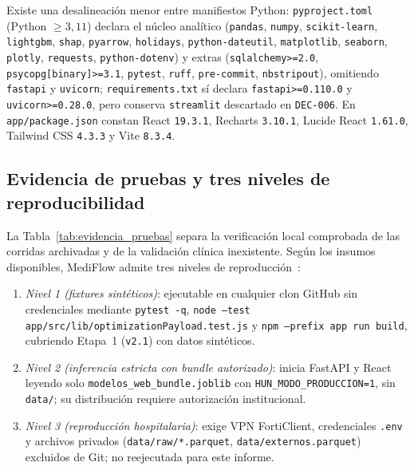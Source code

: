 Existe una desalineación menor entre manifiestos Python: \texttt{pyproject.toml} (Python $\ge 3{,}11$) declara el núcleo analítico (\texttt{pandas}, \texttt{numpy}, \texttt{scikit-learn}, \texttt{lightgbm}, \texttt{shap}, \texttt{pyarrow}, \texttt{holidays}, \texttt{python-dateutil}, \texttt{matplotlib}, \texttt{seaborn}, \texttt{plotly}, \texttt{requests}, \texttt{python-dotenv}) y extras (\texttt{sqlalchemy>=2.0}, \texttt{psycopg[binary]>=3.1}, \texttt{pytest}, \texttt{ruff}, \texttt{pre-commit}, \texttt{nbstripout}), omitiendo \texttt{fastapi} y \texttt{uvicorn}; \texttt{requirements.txt} sí declara \texttt{fastapi>=0.110.0} y \texttt{uvicorn>=0.28.0}, pero conserva \texttt{streamlit} descartado en \texttt{DEC-006}. En \texttt{app/package.json} constan React \texttt{19.3.1}, Recharts \texttt{3.10.1}, Lucide React \texttt{1.61.0}, Tailwind CSS \texttt{4.3.3} y Vite \texttt{8.3.4}.

\subsection{Evidencia de pruebas y tres niveles de reproducibilidad}

La Tabla~\ref{tab:evidencia_pruebas} separa la verificación local comprobada de las corridas archivadas y de la validación clínica inexistente. Según los insumos disponibles, MediFlow admite tres niveles de reproducción~\cite{mediflow2026informe,mediflow2026auditoria}:
\begin{enumerate}[leftmargin=*,nosep]
\item \textit{Nivel 1 (fixtures sintéticos)}: ejecutable en cualquier clon GitHub sin credenciales mediante \texttt{pytest -q}, \texttt{node --test app/src/lib/optimizationPayload.test.js} y \texttt{npm --prefix app run build}, cubriendo Etapa~1 (\texttt{v2.1}) con datos sintéticos.
\item \textit{Nivel 2 (inferencia estricta con bundle autorizado)}: inicia FastAPI y React leyendo solo \texttt{modelos\_web\_bundle.joblib} con \texttt{HUN\_MODO\_PRODUCCION=1}, sin \texttt{data/}; su distribución requiere autorización institucional.
\item \textit{Nivel 3 (reproducción hospitalaria)}: exige VPN FortiClient, credenciales \texttt{.env} y archivos privados (\texttt{data/raw/*.parquet}, \texttt{data/externos.parquet}) excluidos de Git; no reejecutada para este informe.
\end{enumerate}

